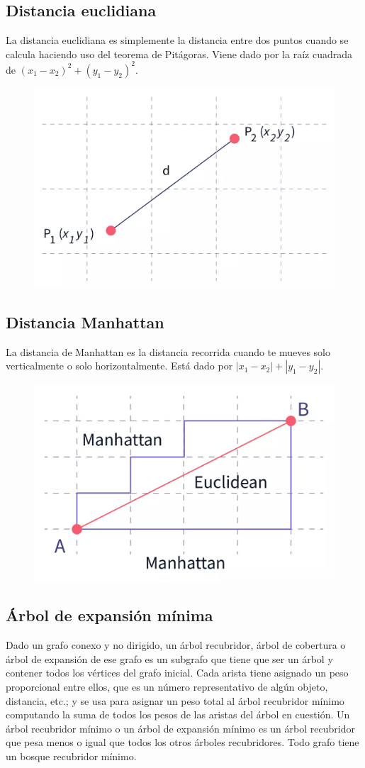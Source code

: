 \subsection{Distancia euclidiana}
La distancia euclidiana es simplemente la distancia entre dos puntos cuando se calcula haciendo uso del teorema de Pitágoras. Viene dado por la raíz cuadrada de $(x_1 - x_2)^2 + (y_1 - y_2)^2$.

\begin{figure}[h!]
	\centering
	\includegraphics[width=0.35\linewidth]{img/distancia_euclidiana}
	\label{fig:distanciaeuclidiana}
\end{figure}


\subsection{Distancia Manhattan}
La distancia de Manhattan es la distancia recorrida cuando te mueves solo verticalmente o solo horizontalmente. Está dado por $ |x_1-x_2| + |y_1-y_2|$.

\begin{figure}[h!]
	\centering
	\includegraphics[width=0.35\linewidth]{img/distancia_manhattan}
	\label{fig:distanciamanhattan}
\end{figure}

\subsection{Árbol de expansión mínima}

Dado un grafo conexo y no dirigido, un árbol recubridor, árbol de cobertura o árbol de expansión de ese grafo es un subgrafo que tiene que ser un árbol y contener todos los vértices del grafo
inicial. Cada arista tiene asignado un peso proporcional entre ellos, que es un número representativo de algún objeto, distancia, etc.; y se usa para asignar un peso total al árbol recubridor mínimo
computando la suma de todos los pesos de las aristas del árbol en cuestión. Un árbol recubridor
mínimo o un árbol de expansión mínimo es un árbol recubridor que pesa menos o igual que todos
los otros árboles recubridores. Todo grafo tiene un bosque recubridor mínimo.
